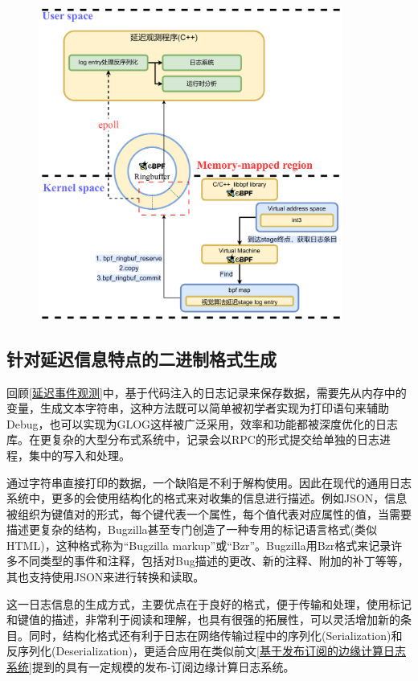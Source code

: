 \documentclass[master,anonymous]{shtthesis}
\begin{document}
\begin{figure}[htbp]
	\centering
	\includegraphics[width=10cm]{img/log.pdf}
	\label{延迟日志向用户态提交的实现}
\end{figure}


\subsection{针对延迟信息特点的二进制格式生成}

回顾\ref{延迟事件观测}中，基于代码注入的日志记录来保存数据，需要先从内存中的变量，生成文本字符串，这种方法既可以简单被初学者实现为打印语句来辅助Debug，也可以实现为GLOG\cite{toubiana2011analysis}这样被广泛采用，效率和功能都被深度优化的日志库。在更复杂的大型分布式系统中，记录会以RPC的形式提交给单独的日志进程，集中的写入和处理。

通过字符串直接打印的数据，一个缺陷是不利于解构使用。因此在现代的通用日志系统中，更多的会使用结构化的格式来对收集的信息进行描述。例如JSON，信息被组织为键值对的形式，每个键代表一个属性，每个值代表对应属性的值，当需要描述更复杂的结构，Bugzilla\cite{serrano2005bugzilla}甚至专门创造了一种专用的标记语言格式(类似HTML)，这种格式称为“Bugzilla markup”或“Bzr”。Bugzilla用Bzr格式来记录许多不同类型的事件和注释，包括对Bug描述的更改、新的注释、附加的补丁等等，其也支持使用JSON来进行转换和读取。

这一日志信息的生成方式，主要优点在于良好的格式，便于传输和处理，使用标记和键值的描述，非常利于阅读和理解，也具有很强的拓展性，可以灵活增加新的条目。同时，结构化格式还有利于日志在网络传输过程中的序列化(Serialization)和反序列化(Deserialization)，更适合应用在类似前文\ref{基于发布订阅的边缘计算日志系统}提到的具有一定规模的发布-订阅边缘计算日志系统。
\end{document}
